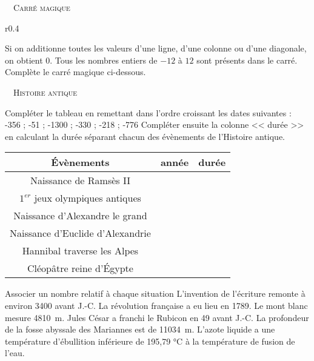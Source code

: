 \documentclass[../Cours.tex]{subfiles}
\begin{document}
\begin{questions}
    \exercice ~~\textsc{Carré magique}\\
    
    \begin{wrapfigure}{r}{0.4\linewidth}
    \vspace{-1cm}
    \end{wrapfigure}
    
    Si on additionne toutes les valeurs d'une ligne, d'une colonne ou d'une diagonale, on obtient 0. Tous les nombres entiers de $-12$ à $12$ sont présents dans le carré.\\
    Complète le carré magique ci-dessous.
    
    \vspace{2cm}
    \exercice ~~\textsc{Histoire antique}
    
    \question Compléter le tableau en remettant dans l'ordre croissant les dates suivantes : \\-356 ; -51 ; -1300 ; -330 ; -218 ; -776
    \question Compléter ensuite la colonne << durée >> en calculant la durée séparant chacun des évènements de l'Histoire antique.
    \begin{center}
    \begin{tabular}{|c|c|c|}\hline
    Évènements & année & durée \\\hline
    Naissance de Ramsès II  & & \\\hline
    $1^{er}$ jeux olympiques antiques  & & \\\hline
    Naissance d'Alexandre le grand & & \\\hline
    Naissance d'Euclide d'Alexandrie & & \\\hline
    Hannibal traverse les Alpes & & \\\hline
    Cléopâtre reine d'Égypte & & \\\hline
    \end{tabular}
    \end{center}

     Associer un nombre relatif à chaque situation
    \question L'invention de l'écriture remonte à environ 3400 avant J.-C.
    \question La révolution française a eu lieu en 1789.
    \question Le mont blanc mesure \qty{4810}{\metre}.
    \question Jules César a franchi le Rubicon en 49 avant J.-C.
    \question La profondeur de la fosse abyssale des Mariannes est de \qty{11034}{\metre}.
    \question L'azote liquide a une température d'ébullition inférieure de 195,79 °C à la température de fusion de l'eau.
\end{questions}
\end{document}
